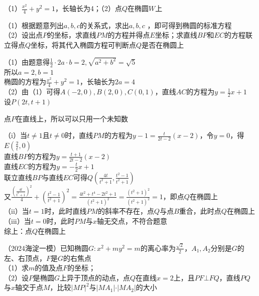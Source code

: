 \begin{corollary*}
（1）$\frac{x^2}{4} + y^2 = 1$，长轴长为4；（2）点$Q$在椭圆$W$上

\end{corollary*}
\begin{property}
（1）根据题意列出$a, b, c$的关系式，求出$a, b, c$ ，即可得到椭圆的标准方程\\（2）设出点$P$的坐标，求直线$PM$的方程并得点$E$坐标；求直线$BP$和$EC$的方程联立得点$Q$坐标，将其代入椭圆方程可判断点$Q$是否在椭圆上


\end{property}

\begin{solution}
（1）由题意得$\frac{1}{2} \cdot 2a \cdot b = 2, \sqrt{a^2 + b^2} = \sqrt{5}$\\
所以$a = 2, b = 1$\\
椭圆的方程为$\frac{x^2}{4} + y^2 = 1$，长轴长为$2a = 4$\\
（2）由（1）可得$A(-2, 0), B(2, 0), C(0, 1)$，直线$AC$的方程为$y = \frac{1}{2}x + 1$\\
设$P(2t, t+ 1)$
\begin{note}
    点$P$在直线上，所以可以只用一个未知数
\end{note}
（i）当$t \ne 1$且$t \ne 0$时，直线$PM$的方程为$y - 1 = \frac{t}{2t-2}(x - 2)$，令$y = 0$，得$E(\frac{2}{t}, 0)$ \\
直线$BP$的方程为$y = \frac{t+1}{2t - 2}(x - 2)$ \\
直线$EC$的方程为$y = -\frac{t}{2}x + 1$ \\
联立直线$BP$与直线$EC$可得$Q(\frac{4t}{t^2 + 1}, \frac{t^2 - 1}{t^2 + 1})$ \\
又$\frac{(\frac{4t}{t^2+1})^2}{4} + (\frac{t^2 - 1}{t^2 + 1})^2 = \frac{4t^2 + t^4 -2t^2 + 1}{(t^2 + 1)^2 } = \frac{(t^2 + 1)^2}{(t^2 + 1)^2} = 1$，即点$Q$在椭圆上\\
（ii）当$t = 1$时，此时直线$PM$的斜率不存在，点$Q$与点$B$重合，此时点$Q$在椭圆上 \\
（iii）当$t = 0$时，此时$PM$与$x$轴无交点，不符合题意 \\
综上：点$Q$在椭圆上
\end{solution}



\begin{example}
（2024海淀一模）已知椭圆$G: x^2 + my^2 =m$的离心率为$\frac{\sqrt{2}}{2}$，$A_1, A_2$分别是$G$的左、右顶点，$F$是$G$的右焦点\\
（1）求$m$的值及点$F$的坐标；\\
（2）设$P$是椭圆$G$上异于顶点的动点，点$Q$在直线$x = 2$上，且$PF \bot FQ$，直线$PQ$与$x$轴交于点$M$，比较$\vert MP \vert ^2$与$\vert MA_1\vert \cdot \vert MA_2 \vert$的大小

\end{example}

